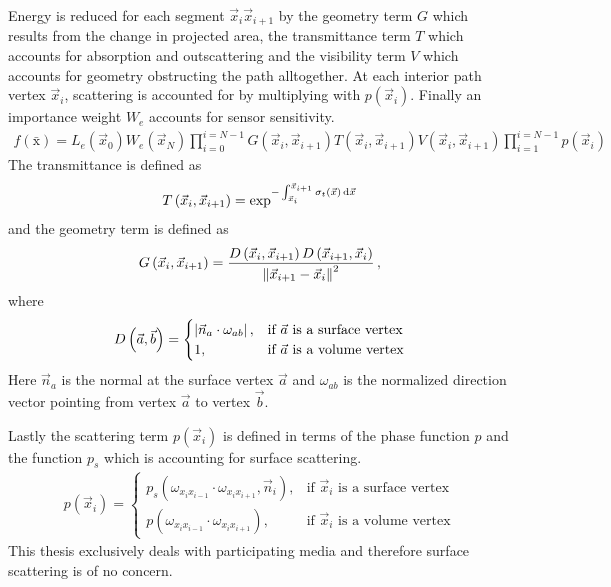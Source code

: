 Energy is reduced for each segment $\vec{x}_i \vec{x}_{i+1}$ by the geometry term $G$ which results from the change in projected area, the transmittance term $T$ which accounts for absorption and outscattering and the visibility term $V$ which accounts for geometry obstructing the path alltogether. At each interior path vertex $\vec{x}_i$, scattering is accounted for by multiplying with $p(\vec{x}_i)$. Finally an importance weight $W_e$ accounts for sensor sensitivity.
\begin{align}
f\left(\bar{\mathrm{x}}\right) =
L_e\left(\vec{x}_0\right)
W_e\left(\vec{x}_N\right)
\prod_{i=0}^{i=N-1}
G\left(\vec{x}_i, \vec{x}_{i+1}\right)
T\left(\vec{x}_i, \vec{x}_{i+1}\right)
V\left(\vec{x}_i, \vec{x}_{i+1}\right)
\prod_{i=1}^{i=N-1}
p\left(\vec{x}_i\right)
\label{eq:foundations_mc_pathintegral}
\end{align}
The transmittance is defined as
\begin{align}
T\left(\vec{x}_i, \vec{x}_{i+1}\right) =
\operatorname{exp}^
{
    -\int_{\vec{x}_i}^{\vec{x}_{i+1}}\sigma_t\left(\vec{x}\right)\,\mathrm{d}\vec{x}
}
\end{align}
and the geometry term is defined as
\begin{align}
G\left(\vec{x}_i, \vec{x}_{i+1}\right) =
\frac{D\left(\vec{x}_{i}, \vec{x}_{i+1}\right)D\left(\vec{x}_{i+1}, \vec{x}_{i}\right)}{\left\lVert\vec{x}_{i+1}-\vec{x}_{i}\right\rVert^2} \,,
\end{align}
where
\begin{align}
D\left(\vec{a}, \vec{b}\right) =
\begin{cases}
\left\vert\vec{n}_a\cdot\omega_{ab}\right\vert, & \text{if $\vec{a}$ is a surface vertex}
\\
1, & \text{if $\vec{a}$ is a volume vertex}
\end{cases}
\end{align}
Here $\vec{n}_a$ is the normal at the surface vertex $\vec{a}$ and $\omega_{ab}$ is the normalized direction vector pointing from vertex $\vec{a}$ to vertex $\vec{b}$.

Lastly the scattering term $p(\vec{x}_i)$ is defined in terms of the phase function $p$ and the function $p_s$ which is accounting for surface scattering.
\begin{align}
p\left(\vec{x}_i\right) =
\begin{cases}
p_s\left(\omega_{x_ix_{i-1}}\cdot\omega_{x_ix_{i+1}}, \vec{n}_i\right), & \text{if $\vec{x}_i$ is a surface vertex}
\\
p\left(\omega_{x_ix_{i-1}}\cdot\omega_{x_ix_{i+1}}\right), & \text{if $\vec{x}_i$ is a volume vertex}
\end{cases}
\end{align}
This thesis exclusively deals with participating media and therefore surface scattering is of no concern.

